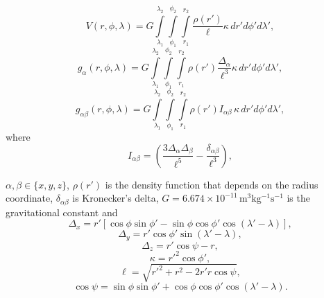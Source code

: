 \documentclass[extra]{gji}
\begin{document}
\begin{equation}
    V(r,\phi,\lambda) = G
    \int\limits_{\lambda_1}^{\lambda_2}
    \int\limits_{\phi_1}^{\phi_2}
    \int\limits_{r_1}^{r_2}
    \frac{\rho(r')}{\ell} \kappa \,  dr' d\phi' d\lambda',
\label{eq:tesseroid-pot}
\end{equation}
\begin{equation}
    g_{\alpha}(r,\phi,\lambda) = G
    \int\limits_{\lambda_1}^{\lambda_2}
    \int\limits_{\phi_1}^{\phi_2}
    \int\limits_{r_1}^{r_2}
    \rho(r') \frac{\Delta_\alpha}{\ell^3}
    \kappa \, dr' d\phi' d\lambda',
\label{eq:tesseroid-grav}
\end{equation}
\begin{equation}
    g_{\alpha\beta}(r,\phi,\lambda) = G
    \int\limits_{\lambda_1}^{\lambda_2}
    \int\limits_{\phi_1}^{\phi_2}
    \int\limits_{r_1}^{r_2}
    \rho(r') I_{\alpha\beta} \, \kappa \, dr' d\phi' d\lambda' ,
    \label{eq:tesseroid-tensor}
\end{equation}
\noindent where
\begin{equation}
    I_{\alpha\beta} =
    \left(
        \frac{3\Delta_{\alpha} \Delta_{\beta}}{\ell^5} -
        \frac{\delta_{\alpha\beta}}{\ell^3}
    \right) ,
    \label{eq:tesseroid-tensor-kernel}
\end{equation}

\noindent $\alpha, \beta \in \{x, y, z\}$,
$\rho(r')$ is the density function that depends on the radius coordinate,
$\delta_{\alpha\beta}$ is Kronecker's delta,
$G = 6.674\times10^{-11}\, \text{m$^3$kg$^{-1}$s$^{-1}$}$ is the gravitational constant and
\begin{equation}
    \Delta_x = r'[\cos\phi\sin\phi' - \sin\phi\cos\phi'
               \cos(\lambda' - \lambda)],
\end{equation}
\begin{equation}
    \Delta_y = r' \cos \phi' \sin(\lambda' - \lambda),
\end{equation}
\begin{equation}
    \Delta_z = r' \cos \psi - r,
\end{equation}
\begin{equation}
    \kappa = {r'}^2 \cos \phi',
\end{equation}
\begin{equation}
    \ell = \sqrt{{r'}^2 + r^2 - 2 r' r \cos \psi},
\label{eq:ell}
\end{equation}
\begin{equation}
    \cos\psi = \sin\phi\sin\phi' + \cos\phi\cos\phi'
                 \cos(\lambda' - \lambda).
\label{eq:cospsi}
\end{equation}
\end{document}
